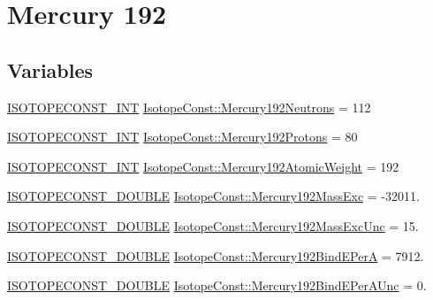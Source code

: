 \hypertarget{group___isotope_const-_mercury-_hg192}{}\section{Mercury 192}
\label{group___isotope_const-_mercury-_hg192}
\subsection*{Variables}
\begin{DoxyCompactItemize}
\item 
\mbox{\hyperlink{group___isotope_const-_macros_ga5f18360b3e99483a35c32d789e62621c}{I\+S\+O\+T\+O\+P\+E\+C\+O\+N\+S\+T\+\_\+\+I\+NT}} \mbox{\hyperlink{group___isotope_const-_mercury-_hg192_gae9720a07992e330142883572596fb392}{Isotope\+Const\+::\+Mercury192\+Neutrons}} = 112
\item 
\mbox{\hyperlink{group___isotope_const-_macros_ga5f18360b3e99483a35c32d789e62621c}{I\+S\+O\+T\+O\+P\+E\+C\+O\+N\+S\+T\+\_\+\+I\+NT}} \mbox{\hyperlink{group___isotope_const-_mercury-_hg192_ga86690e00cabbf9e52963943be7979e70}{Isotope\+Const\+::\+Mercury192\+Protons}} = 80
\item 
\mbox{\hyperlink{group___isotope_const-_macros_ga5f18360b3e99483a35c32d789e62621c}{I\+S\+O\+T\+O\+P\+E\+C\+O\+N\+S\+T\+\_\+\+I\+NT}} \mbox{\hyperlink{group___isotope_const-_mercury-_hg192_ga1e1095f6eeb4a672b40164c44d0c28d6}{Isotope\+Const\+::\+Mercury192\+Atomic\+Weight}} = 192
\item 
\mbox{\hyperlink{group___isotope_const-_macros_ga8f45a7272ce02c0b4c65c44636ed719a}{I\+S\+O\+T\+O\+P\+E\+C\+O\+N\+S\+T\+\_\+\+D\+O\+U\+B\+LE}} \mbox{\hyperlink{group___isotope_const-_mercury-_hg192_gaef1cfc5491e8f7fabaee9748fba68ba8}{Isotope\+Const\+::\+Mercury192\+Mass\+Exc}} = -\/32011.
\item 
\mbox{\hyperlink{group___isotope_const-_macros_ga8f45a7272ce02c0b4c65c44636ed719a}{I\+S\+O\+T\+O\+P\+E\+C\+O\+N\+S\+T\+\_\+\+D\+O\+U\+B\+LE}} \mbox{\hyperlink{group___isotope_const-_mercury-_hg192_ga025011c33e089d057b9eaaaf3e4032e7}{Isotope\+Const\+::\+Mercury192\+Mass\+Exc\+Unc}} = 15.
\item 
\mbox{\hyperlink{group___isotope_const-_macros_ga8f45a7272ce02c0b4c65c44636ed719a}{I\+S\+O\+T\+O\+P\+E\+C\+O\+N\+S\+T\+\_\+\+D\+O\+U\+B\+LE}} \mbox{\hyperlink{group___isotope_const-_mercury-_hg192_gae397ebc9f2945ccf48847bc24799cdf0}{Isotope\+Const\+::\+Mercury192\+Bind\+E\+PerA}} = 7912.
\item 
\mbox{\hyperlink{group___isotope_const-_macros_ga8f45a7272ce02c0b4c65c44636ed719a}{I\+S\+O\+T\+O\+P\+E\+C\+O\+N\+S\+T\+\_\+\+D\+O\+U\+B\+LE}} \mbox{\hyperlink{group___isotope_const-_mercury-_hg192_ga86ca02db5e1b139acf8aebf36109e857}{Isotope\+Const\+::\+Mercury192\+Bind\+E\+Per\+A\+Unc}} = 0.

\end{DoxyCompactItemize}
